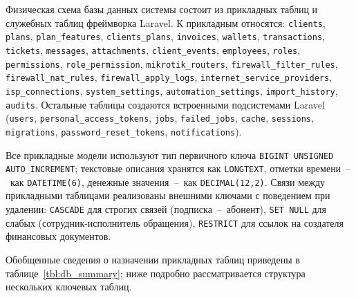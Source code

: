 Физическая схема базы данных системы состоит из прикладных таблиц и служебных таблиц фреймворка Laravel. К прикладным относятся:
\texttt{clients}, \texttt{plans}, \texttt{plan\_features}, \texttt{clients\_plans},
\texttt{invoices}, \texttt{wallets}, \texttt{transactions},
\texttt{tickets}, \texttt{messages}, \texttt{attachments}, \texttt{client\_events},
\texttt{employees}, \texttt{roles}, \texttt{permissions}, \texttt{role\_permission},
\texttt{mikrotik\_routers}, \texttt{firewall\_filter\_rules}, \texttt{firewall\_nat\_rules}, \texttt{firewall\_apply\_logs},
\texttt{internet\_service\_providers}, \texttt{isp\_connections},
\texttt{system\_settings}, \texttt{automation\_settings}, \texttt{import\_history}, \texttt{audits}.
Остальные таблицы создаются встроенными подсистемами Laravel
(\texttt{users}, \texttt{personal\_access\_tokens}, \texttt{jobs}, \texttt{failed\_jobs},
\texttt{cache}, \texttt{sessions}, \texttt{migrations}, \texttt{password\_reset\_tokens}, \texttt{notifications}).

Все прикладные модели используют тип первичного ключа \texttt{BIGINT UNSIGNED AUTO\_INCREMENT}; текстовые описания хранятся как \texttt{LONGTEXT}, отметки времени~--~как \texttt{DATETIME(6)}, денежные значения~--~как \texttt{DECIMAL(12,2)}. Связи между прикладными таблицами реализованы внешними ключами с поведением при удалении: \texttt{CASCADE} для строгих связей (подписка~--~абонент), \texttt{SET~NULL} для слабых (сотрудник-исполнитель обращения), \texttt{RESTRICT} для ссылок на создателя финансовых документов.

Обобщенные сведения о назначении прикладных таблиц приведены в таблице~\ref{tbl:db_summary}; ниже подробно рассматривается структура нескольких ключевых таблиц.

